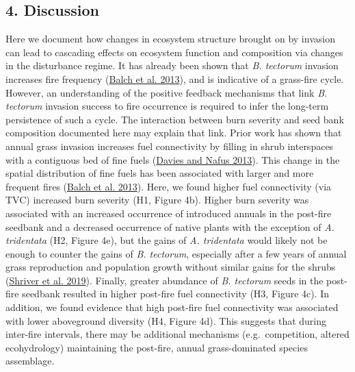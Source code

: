 \documentclass[
  12pt,
]{article}
\begin{document}
\hypertarget{discussion}{%
\subsection{4. Discussion}\label{discussion}}

Here we document how changes in ecosystem structure brought on by
invasion can lead to cascading effects on ecosystem function and
composition via changes in the disturbance regime. It has already been
shown that \emph{B. tectorum} invasion increases fire frequency
(\protect\hyperlink{ref-Balch2013}{Balch et al. 2013}), and is
indicative of a grass-fire cycle. However, an understanding of the
positive feedback mechanisms that link \emph{B. tectorum} invasion
success to fire occurrence is required to infer the long-term
persistence of such a cycle. The interaction between burn severity and
seed bank composition documented here may explain that link. Prior work
has shown that annual grass invasion increases fuel connectivity by
filling in shrub interspaces with a contiguous bed of fine fuels
(\protect\hyperlink{ref-Davies2013}{Davies and Nafus 2013}). This change
in the spatial distribution of fine fuels has been associated with
larger and more frequent fires (\protect\hyperlink{ref-Balch2013}{Balch
et al. 2013}). Here, we found higher fuel connectivity (via TVC)
increased burn severity (H1, Figure 4b). Higher burn severity was
associated with an increased occurrence of introduced annuals in the
post-fire seedbank and a decreased occurrence of native plants with the
exception of \emph{A. tridentata} (H2, Figure 4e), but the gains of
\emph{A. tridentata} would likely not be enough to counter the gains of
\emph{B. tectorum}, especially after a few years of annual grass
reproduction and population growth without similar gains for the shrubs
(\protect\hyperlink{ref-Shriver2019}{Shriver et al. 2019}). Finally,
greater abundance of \emph{B. tectorum} seeds in the post-fire seedbank
resulted in higher post-fire fuel connectivity (H3, Figure 4c). In
addition, we found evidence that high post-fire fuel connectivity was
associated with lower aboveground diversity (H4, Figure 4d). This
suggests that during inter-fire intervals, there may be additional
mechanisms (e.g.~competition, altered ecohydrology) maintaining the
post-fire, annual grass-dominated species assemblage.
\end{document}
